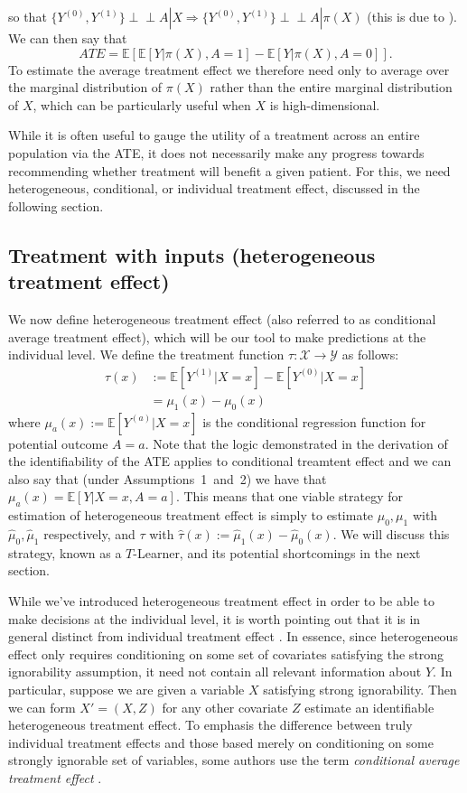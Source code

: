 \documentclass[../thesis.tex]{subfiles}
\begin{document}
so that $\{Y^{(0)}, Y^{(1)}\} \perp\!\!\!\perp A | X \Rightarrow \{Y^{(0)}, Y^{(1)}\} \perp\!\!\!\perp A | \pi(X)$ (this is due to \citealt{rosenbaum_central_1983}). We can then say that
\[ATE = \mathbb{E}[\mathbb{E}[Y|\pi(X), A=1] - \mathbb{E}[Y|\pi(X), A=0]].\]
To estimate the average treatment effect we therefore need only to average over the marginal distribution of $\pi(X)$ rather than the entire marginal distribution of $X$, which can be particularly useful when $X$ is high-dimensional.

While it is often useful to gauge the utility of a treatment across an entire population via the ATE, it does not necessarily make any progress towards recommending whether treatment will benefit a given patient. For this, we need heterogeneous, conditional, or individual treatment effect, discussed in the following section.

\subsection{Treatment with inputs (heterogeneous treatment effect)}
We now define heterogeneous treatment effect (also referred to as conditional average treatment effect), which will be our tool to make predictions at the individual level. We define the treatment function $\tau: \mathcal{X} \rightarrow \mathcal{Y}$ as follows:
\begin{align*}
    \tau(x) & := \mathbb{E}[Y^{(1)} | X =x] - \mathbb{E}[Y^{(0)} | X=x] \\
    & = \mu_1(x) - \mu_0(x) 
\end{align*}
where $\mu_a(x) := \mathbb{E}[Y^{(a)}|X=x]$ is the conditional regression function for potential outcome $A=a$. Note that the logic demonstrated in the derivation of the identifiability of the ATE applies to conditional treamtent effect and we can also say that (under Assumptions~1~and~2) we have that $\mu_a(x) = \mathbb{E}[Y|X=x,A=a]$. This means that one viable strategy for estimation of heterogeneous treatment effect is simply to estimate $\mu_0,\mu_1$ with $\hat{\mu}_0, \hat{\mu}_1$ respectively, and $\tau$ with $\hat{\tau}(x) := \hat{\mu}_1(x) - \hat{\mu}_0(x)$. We will discuss this strategy, known as a $T$-Learner, and its potential shortcomings in the next section.

While we've introduced heterogeneous treatment effect in order to be able to make decisions at the individual level, it is worth pointing out that it is in general distinct from individual treatment effect \citep{vegetabile_distinction_2021}. In essence, since heterogeneous effect only requires conditioning on some set of covariates satisfying the strong ignorability assumption, it need not contain all relevant information about $Y$. In particular, suppose we are given a variable $X$ satisfying strong ignorability. Then we can form $X'=(X,Z)$ for any other covariate $Z$ estimate an identifiable heterogeneous treatment effect. To emphasis the difference between truly individual treatment effects and those based merely on conditioning on some strongly ignorable set of variables, some authors use the term \emph{conditional average treatment effect} \citep{vegetabile_distinction_2021}.
\end{document}
